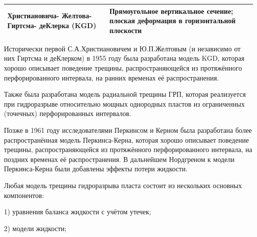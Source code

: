\begin{longtable}[l]{|L{2.8cm}|L{6.7cm}|L{6.2cm}|}
	Христиановича- Желтова- Гиртсма- деКлерка (KGD)&Прямоугольное вертикальное сечение; плоская деформация в горизонтальной плоскости&\hfill\break{}\\ \hline
	
\end{longtable}
\normalsize%
\endgroup

Исторически первой С.А.Христиановичем и Ю.П.Желтовым (и независимо от них Гиртсма и деКлерком) в 1955 году была разработана модель KGD, которая хорошо описывает поведение трещины, распространяющейся из протяжённого перфорированного интервала, на ранних временах её распространения.

Также была разработана модель радиальной трещины ГРП, которая реализуется при гидроразрыве относительно мощных однородных пластов из ограниченных (точечных) перфорированных интервалов.

Позже в 1961 году исследователями Перкинсом и Керном была разработана более распространённая модель Перкинса-Керна, которая хорошо описывает поведение трещины, распространяющейся из протяжённого перфорированного интервала, на поздних временах её распространения.
В дальнейшем Нордгреном к модели Перкинса-Керна были добавлены эффекты потери жидкости.

Любая модель трещины гидроразрыва пласта состоит из нескольких основных компонентов:

1) уравнения баланса жидкости с учётом утечек;

2) модели жидкости;

